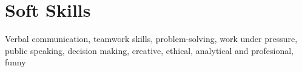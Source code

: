\documentclass[letterpaper,11pt]{article}
\begin{document}
\section{Soft Skills}
 \begin{itemize}[leftmargin=0.15in, label={}]
    \small{\item{
     Verbal communication, teamwork skills, problem-solving, work under pressure, public speaking, decision making, creative, ethical, analytical and profesional, funny
   }}
 \end{itemize}

\end{document}
